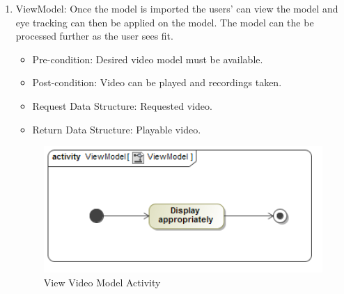 \begin{enumerate}
			\item{ViewModel:}
Once the model is imported the users' can view the model and eye tracking can then be applied on the 	model. The model can the be processed further as the user sees fit.
			\begin{itemize}
				\item Pre-condition: Desired video model must be available.
				\item Post-condition: Video can be played and recordings taken.
				\item Request Data Structure: Requested video.
				\item Return Data Structure: Playable video.
			\end{itemize}
			\begin{figure}
				\centering
				\includegraphics[scale=0.5,width=15cm,keepaspectratio]{Diagrams/Activity_Diagram__ViewModel__ViewModel.png}
				\caption{View Video Model Activity}
			\end{figure}
			
			
			

\end{enumerate}
